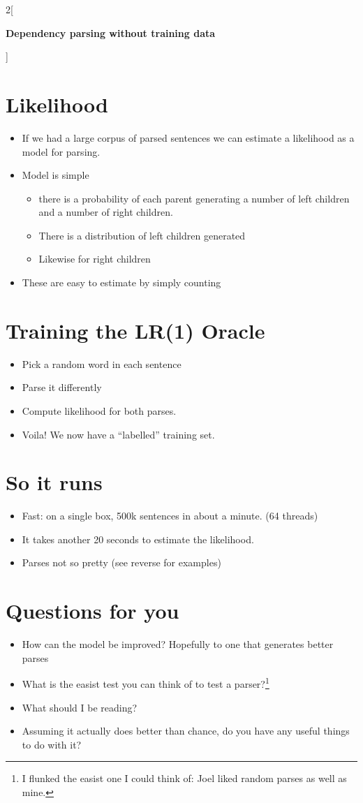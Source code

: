 \documentclass[12pt]{extarticle}
\begin{document}
\begin{multicols*}{2}[
\centerline{\Huge\bf Dependency parsing without training data}
\vspace{2ex}
]
\section*{Likelihood}
\begin{itemize}
\item If we had a large corpus of parsed sentences we can estimate a
likelihood as a model for parsing.
\item Model is simple
\begin{itemize}
\item  there is a probability of each parent
generating a number of left children and a number of right children.
\item There is a distribution of left children generated
\item Likewise for right children
\end{itemize}
\item These are easy to estimate by simply counting
\end{itemize}

\section*{Training the LR(1) Oracle}
\begin{itemize}
\item Pick a random word in each sentence
\item Parse it differently
\item Compute likelihood for both parses.
\item Voila!  We now have a ``labelled'' training set.
\end{itemize}

\section*{So it runs}
\begin{itemize}
\item Fast: on a single box, 500k sentences in about a minute. (64 threads)
\item It takes another 20 seconds to estimate the likelihood.
\item Parses not so pretty (see reverse for examples)
\end{itemize}

\section*{Questions for you}
\begin{itemize}
\item How can the model be improved?  Hopefully to one that generates
better parses
\item What is the easist test you can think of to test a parser?\footnote{I
flunked the easist one I could think of: Joel liked random parses as
well as mine.}
\item What should I be reading?
\item Assuming it actually does better than chance, do you have any
useful things to do with it?
\end{itemize}


\end{multicols*}
\end{document}
